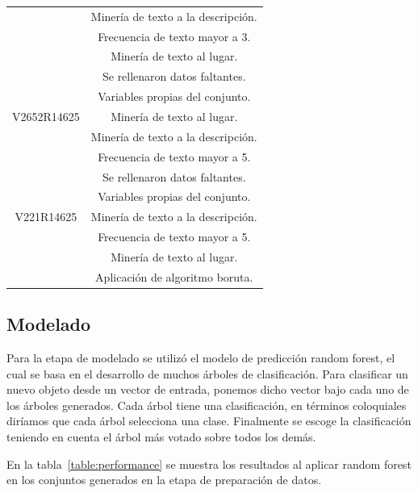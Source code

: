 \begin{table}
\begin{center}
\begin{tabular}{|c|c|}
	& Minería de texto a la descripción. \\
        & Frecuencia de texto mayor a 3. \\
        & Minería de texto al lugar. \\ \hline
        & Se rellenaron datos faltantes. \\ 
        & Variables propias del conjunto. \\
   V2652R14625 & Minería de texto al lugar. \\
        & Minería de texto a la descripción. \\
        & Frecuencia de texto mayor a 5. \\ \hline
        & Se rellenaron datos faltantes. \\ 
        & Variables propias del conjunto. \\
   V221R14625 & Minería de texto a la descripción. \\
        & Frecuencia de texto mayor a 5. \\
        & Minería de texto al lugar. \\
        & Aplicación de algoritmo boruta. \\ \hline
    \end{tabular}
\end{center}
\end{table}



\subsection{Modelado}

Para la etapa de modelado se utilizó el modelo de predicción random forest, el cual se basa en el desarrollo de
muchos árboles de clasificación. Para clasificar un nuevo objeto desde un vector de entrada,
ponemos dicho vector bajo cada uno de los árboles generados. Cada árbol tiene una clasificación, 
en términos coloquiales diríamos que cada árbol  selecciona una clase. Finalmente se escoge 
la clasificación teniendo en cuenta el árbol más votado sobre todos los demás. 

En la tabla~\ref{table:performance} se muestra los resultados al aplicar random forest en los conjuntos
generados en la etapa de preparación de datos.

